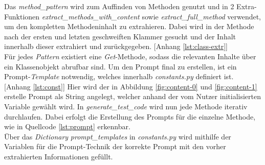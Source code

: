 \vspace{-.3cm}
Das \textit{method\_pattern} wird zum Auffinden von Methoden genutzt und in 2 Extra-Funktionen \textit{extract\_methods\_with\_content} sowie \textit{extract\_full\_method} verwendet, um den kompletten Methodeninhalt zu extrahieren. Dabei wird in der Methode nach der ersten und letzten geschweiften Klammer gesucht und der Inhalt innerhalb dieser extrahiert und zurückgegeben. [Anhang \ref{lst:class-extr}]\\ Für jedes \textit{Pattern} existiert eine \textit{Get}-Methode, sodass die relevanten Inhalte über ein Klassenobjekt abrufbar sind. Um den Prompt final zu erstellen, ist ein Prompt-\textit{Template} notwendig, welches innerhalb \textit{constants.py} definiert ist. [Anhang \ref{lst:const}] Hier wird der in Abbildung \ref{fig:content-0} und \ref{fig:content-1} erstelle Prompt als String angelegt, welcher anhand der vom Nutzer initialisierten Variable gewählt wird. In \textit{generate\_test\_code} wird nun jede Methode iterativ durchlaufen. Dabei erfolgt die Erstellung des Prompts für die einzelne Methode, wie in Quellcode \ref{lst:prompt} erkennbar.\\ Über das \textit{Dictionary} \textit{prompt\_templates} in \textit{constants.py} wird mithilfe der Variablen für die Prompt-Technik der korrekte Prompt mit den vorher extrahierten Informationen gefüllt.\\
\vspace{-.3cm}

